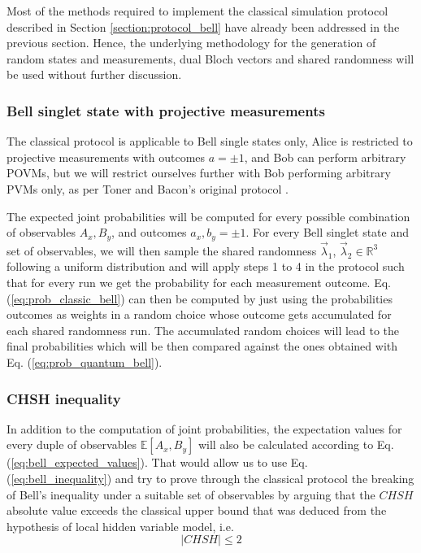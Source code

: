 Most of the methods required to implement the classical simulation protocol described in Section \ref{section:protocol_bell} have already been addressed in the previous section. Hence, the underlying methodology for the generation of random states and measurements, dual Bloch vectors and shared randomness will be used without further discussion.

\subsubsection{Bell singlet state with projective measurements}

The classical protocol is applicable to Bell single states only, Alice is restricted to projective measurements with outcomes $a=\pm1$, and Bob can perform arbitrary POVMs, but we will restrict ourselves further with Bob performing arbitrary PVMs only, as per Toner and Bacon's original protocol \cite{toner2003}.

The expected joint probabilities will be computed for every possible combination of observables $A_{x}, B_{y}$, and outcomes $a_{x}, b_{y} = \pm1$. For every Bell singlet state and set of observables, we will then sample the shared randomness $\vec{\lambda}_1$, $\vec{\lambda}_2 \in \mathbb{R}^3$ following a uniform distribution and will apply steps 1 to 4 in the protocol such that for every run we get the probability for each measurement outcome. Eq. (\ref{eq:prob_classic_bell}) can then be computed by just using the probabilities outcomes as weights in a random choice whose outcome gets accumulated for each shared randomness run. The accumulated random choices will lead to the final probabilities which will be then compared against the ones obtained with Eq. (\ref{eq:prob_quantum_bell}).

\subsubsection{CHSH inequality}
In addition to the computation of joint probabilities, the expectation values for every duple of observables $\mathbb{E}[A_{x}, B_{y}]$ will also be calculated according to Eq. (\ref{eq:bell_expected_values}). That would allow us to use Eq. (\ref{eq:bell_inequality}) and try to prove through the classical protocol the breaking of Bell's inequality under a suitable set of observables by arguing that the $CHSH$ absolute value exceeds the classical upper bound that was deduced from the hypothesis of local hidden variable model, i.e.
\begin{equation}\label{eq:chsh_inequality}
|{CHSH}| \leq 2
\end{equation}